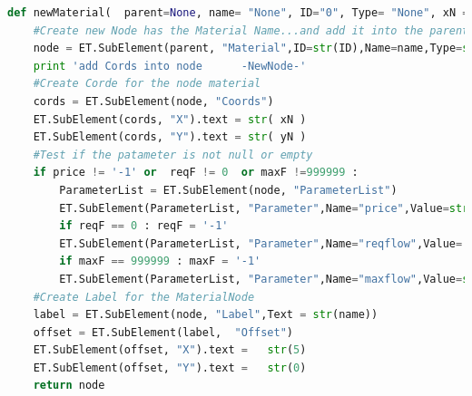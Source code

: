 \begin{lstlisting}[language=Python, caption=Python Function Material]
def newMaterial(  parent=None, name= "None", ID="0", Type= "None", xN ='-1', yN ='-1' ,price='-1' ,reqF = 0  ,maxF =999999 ):
	#Create new Node has the Material Name...and add it into the parent node
	node = ET.SubElement(parent, "Material",ID=str(ID),Name=name,Type=str(Type))
    print 'add Cords into node		-NewNode-'
	#Create Corde for the node material
	cords = ET.SubElement(node, "Coords")
	ET.SubElement(cords, "X").text = str( xN )
	ET.SubElement(cords, "Y").text = str( yN )
	#Test if the patameter is not null or empty
	if price != '-1' or  reqF != 0  or maxF !=999999 : 
		ParameterList = ET.SubElement(node, "ParameterList")
		ET.SubElement(ParameterList, "Parameter",Name="price",Value=str( price) )
		if reqF == 0 : reqF = '-1'
		ET.SubElement(ParameterList, "Parameter",Name="reqflow",Value= str(reqF) )
		if maxF == 999999 : maxF = '-1'
		ET.SubElement(ParameterList, "Parameter",Name="maxflow",Value=str(maxF) )
	#Create Label for the MaterialNode
	label = ET.SubElement(node, "Label",Text = str(name))
	offset = ET.SubElement(label,  "Offset")
	ET.SubElement(offset, "X").text =   str(5)
	ET.SubElement(offset, "Y").text =   str(0)
	return node
\end{lstlisting}

